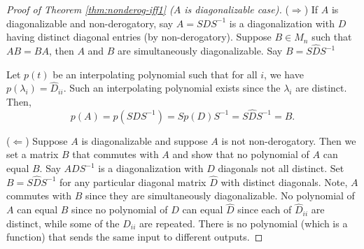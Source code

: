 \begin{proof}[Proof of Theorem \ref{thm:nonderog-iff1} ($A$ is diagonalizable case)]

($\Longrightarrow$) If $A$ is diagonalizable and non-derogatory, say $A = SDS^{-1}$ is a diagonalization with $D$ having distinct diagonal entries (by non-derogatory). Suppose $B \in M_n$ such that $AB = BA$, then $A$ and $B$ are simultaneously diagonalizable. Say $B = S\hat{D}S^{-1}$

Let $p(t)$ be an interpolating polynomial such that for all $i$, we have $p(\lambda_i) = \hat{D}_{ii}$. Such an interpolating polynomial exists since the $\lambda_i$ are distinct. Then,
$$
p(A) = p(SDS^{-1}) = Sp(D)S^{-1} = S\hat{D}S^{-1} = B.
$$

($\Longleftarrow$) Suppose $A$ is diagonalizable and suppose $A$ is not non-derogatory. Then we set a matrix $B$ that commutes with $A$ and show that no polynomial of $A$ can equal $B$. Say $ADS^{-1}$ is a diagonalization with $D$ diagonals not all distinct. Set $B = S\hat{D} S^{-1}$ for any particular diagonal matrix $\hat{D}$ with distinct diagonals. Note, $A$ commutes with $B$ since they are simultaneously diagonalizable. No polynomial of $A$ can equal $B$ since no polynomial of $D$ can equal $\hat{D}$ since each of $\hat{D}_{ii}$ are distinct, while some of the $D_{ii}$ are repeated. There is no polynomial (which is a function) that sends the same input to different outputs.
\end{proof}